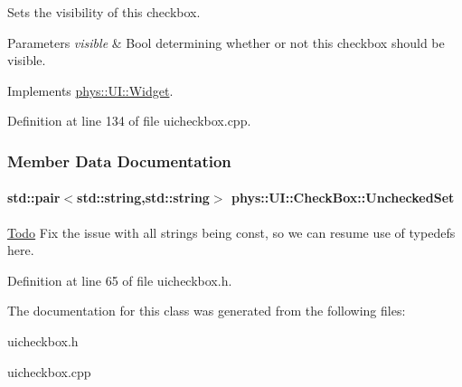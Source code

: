 Sets the visibility of this checkbox. 


\begin{DoxyParams}{Parameters}
{\em visible} & Bool determining whether or not this checkbox should be visible. \\
\hline
\end{DoxyParams}


Implements \hyperlink{classphys_1_1UI_1_1Widget_ab049233d8d5522a6ab42654b8924a3e0}{phys::UI::Widget}.



Definition at line 134 of file uicheckbox.cpp.



\subsubsection{Member Data Documentation}
\hypertarget{classphys_1_1UI_1_1CheckBox_a7b670d93f119193283ec78b94f842429}{
\paragraph[{UncheckedSet}]{\setlength{\rightskip}{0pt plus 5cm}std::pair$<$std::string,std::string$>$ {\bf phys::UI::CheckBox::UncheckedSet}}\hfill}
\label{classphys_1_1UI_1_1CheckBox_a7b670d93f119193283ec78b94f842429}
\begin{Desc}
\item[\hyperlink{todo__todo000026}{Todo}]Fix the issue with all strings being const, so we can resume use of typedefs here. \end{Desc}


Definition at line 65 of file uicheckbox.h.



The documentation for this class was generated from the following files:\begin{DoxyCompactItemize}
\item 
uicheckbox.h\item 
uicheckbox.cpp\end{DoxyCompactItemize}
